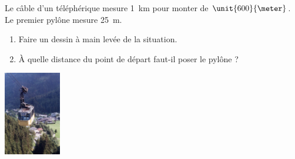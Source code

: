 

\begin{exercice}\label{exo2smath-0175}


    \begin{multicols}{2}
        Le câble d'un téléphérique mesure \SI{1}{\kilo\meter}  pour monter de \( \unit{600}{\meter}\). Le premier pylône mesure \SI{25}{\meter}.
    \begin{enumerate}
        \item
            Faire un dessin à main levée de la situation.
        \item
    À quelle distance du point de départ faut-il poser le pylône ?
    \end{enumerate}

    \columnbreak
    \includegraphics[width=2.5cm]{telepherique.pdf}
    \end{multicols}


\end{exercice}
